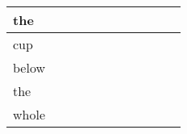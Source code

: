 \documentclass[landscape]{article}
\newcommand{\ssp}{\hspace{2pt}}
\begin{document}
\begin{tabular}{|l|p{10pt}|p{10pt}|p{10pt}|p{10pt}|p{10pt}|p{10pt}|p{10pt}|p{10pt}|p{10pt}|p{10pt}|}
\hline
\ssp the \ssp&\hspace{2pt}&\hspace{2pt}&\hspace{2pt}&\hspace{2pt}&\hspace{2pt}&\hspace{2pt}&\hspace{2pt}&\hspace{2pt}&\hspace{2pt}&\hspace{2pt}\\
\hline
\ssp cup \ssp&\hspace{2pt}&\hspace{2pt}&\hspace{2pt}&\hspace{2pt}&\hspace{2pt}&\hspace{2pt}&\hspace{2pt}&\hspace{2pt}&\hspace{2pt}&\hspace{2pt}\\
\hline
\ssp below \ssp&\hspace{2pt}&\hspace{2pt}&\hspace{2pt}&\hspace{2pt}&\hspace{2pt}&\hspace{2pt}&\hspace{2pt}&\hspace{2pt}&\hspace{2pt}&\hspace{2pt}\\
\hline
\ssp the \ssp&\hspace{2pt}&\hspace{2pt}&\hspace{2pt}&\hspace{2pt}&\hspace{2pt}&\hspace{2pt}&\hspace{2pt}&\hspace{2pt}&\hspace{2pt}&\hspace{2pt}\\
\hline
\ssp whole \ssp&\hspace{2pt}&\hspace{2pt}&\hspace{2pt}&\hspace{2pt}&\hspace{2pt}&\hspace{2pt}&\hspace{2pt}&\hspace{2pt}&\hspace{2pt}&\hspace{2pt}\\

\end{tabular}
\end{document}
